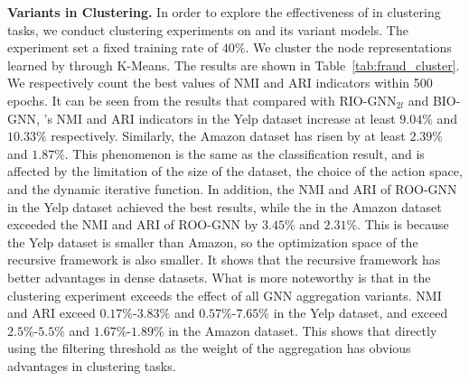 \begin{table}[t]
    \setlength{\abovecaptionskip}{0.cm}
    \setlength{\belowcaptionskip}{-0.cm}
    \caption{Fraud detection clustering results ($\%$) compared to \RioGNN variants.}\label{tab:fraud_cluster}
    \centering
\end{table}



\textbf{\RioGNN Variants in Clustering. }
In order to explore the effectiveness of \RioGNN in clustering tasks, we conduct clustering experiments on \RioGNN and its variant models. 
The experiment set a fixed training rate of $40\%$. 
We cluster the node representations learned by \RioGNN through K-Means. 
The results are shown in Table~\ref{tab:fraud_cluster}. 
We respectively count the best values of NMI and ARI indicators within 500 epochs. 
It can be seen from the results that compared with RIO-GNN$_{2l}$ and BIO-GNN, \RioGNN's NMI and ARI indicators in the Yelp dataset increase at least $9.04\%$ and $10.33\%$ respectively. 
Similarly, the Amazon dataset has risen by at least $2.39\%$ and $1.87\%$. 
This phenomenon is the same as the classification result, and is affected by the limitation of the size of the dataset, the choice of the action space, and the dynamic iterative function. 
In addition, the NMI and ARI of ROO-GNN in the Yelp dataset achieved the best results, while the \RioGNN in the Amazon dataset exceeded the NMI and ARI of ROO-GNN by $3.45\%$ and $2.31\%$. 
This is because the Yelp dataset is smaller than Amazon, so the optimization space of the recursive framework is also smaller. 
It shows that the recursive framework has better advantages in dense datasets. 
What is more noteworthy is that \RioGNN in the clustering experiment exceeds the effect of all GNN aggregation variants. 
NMI and ARI exceed $0.17\%$-$3.83\%$ and $0.57\%$-$7.65\%$ in the Yelp dataset, and exceed $2.5\%$-$5.5\%$ and $1.67\%$-$1.89\%$ in the Amazon dataset. 
This shows that directly using the filtering threshold as the weight of the aggregation has obvious advantages in clustering tasks.


